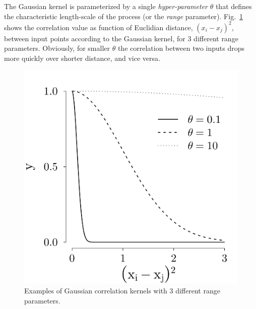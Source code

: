 The Gaussian kernel is parameterized by a single \emph{hyper-parameter} $\theta$ that defines the characteristic length-scale of the process (or the \emph{range} parameter).
Fig.~\ref{fig:plot_corrfun_gauss} shows the correlation value as function of Euclidian distance, $(x_i - x_j)^2$, between input points according to the Gaussian kernel, 
for 3 different range parameters.
Obviously, for smaller $\theta$ the correlation between two inputs drops more quickly over shorter distance, and vice versa.
\begin{figure}[bth]
	\centering
	\includegraphics[scale=0.35]{../figures/chapter4/figures/plotCorrFunGauss}
	\caption[Gaussian correlation kernels with 3 different range parameters.]{Examples of Gaussian correlation kernels with 3 different range parameters.}
	\label{fig:plot_corrfun_gauss}
\end{figure}

